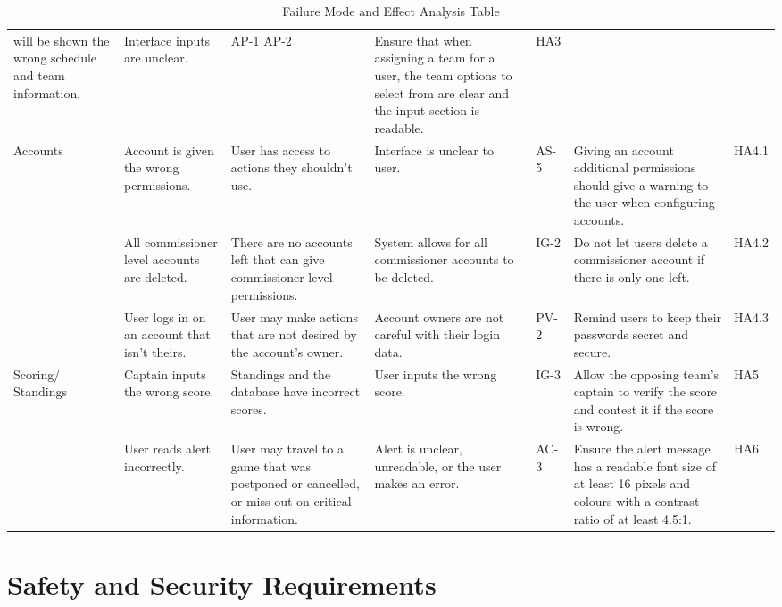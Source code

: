 \documentclass{article}
\begin{document}
\begin{landscape}
\begin{table}[ht]
\begin{tabularx}{504pt}{|p{3cm}||p{4cm}|p{4cm}|p{4cm}|p{1cm}|p{5.75cm}|p{1cm}|}
will be shown the wrong schedule and team information. & Interface inputs are
unclear. & AP-1 AP-2 & Ensure that when assigning a team for a
user, the team options to select from are clear and the input section is
readable. & HA3\\
\cline{1-7}
\multirow{2}{2cm}{Accounts} & Account is given the wrong permissions. & User 
has access to actions they shouldn't use. & Interface is unclear to user. & AS-5 & Giving an account additional permissions should give
a warning to the user when configuring accounts. & HA4.1\\
\cline{2-7}
& All commissioner level accounts are deleted. & There are no accounts left
that can give commissioner level permissions. & System allows for all
commissioner accounts to be deleted. & IG-2 & Do not let users delete a
commissioner account if there is only one left. & HA4.2\\
\cline{2-7}
& User logs in on an account that isn't theirs. & User may make actions that
are not desired by the account's owner. & Account owners are not careful with
their login data. & PV-2 & Remind users to keep their passwords secret and secure.
& HA4.3\\
\cline{1-7}
\multirow{3}{2cm}{Scoring/ Standings} & Captain inputs the wrong score. &
Standings and the database have incorrect scores. & User inputs the wrong score. &
IG-3 & Allow the opposing team's captain to verify the score and contest it if
the score is wrong. & HA5\\
\cline{2-7}
\cline{1-7}
\multirow{3}{2cm}{Alerts} & User reads alert incorrectly. &
User may travel to a game that was postponed or cancelled, or miss out on
critical information. & Alert is unclear, unreadable, or the user makes an error. &
AC-3 & Ensure the alert message has a readable font size of at least 16 pixels
and colours with a contrast ratio of at least 4.5:1. & HA6\\
\cline{2-7}
\hline
\end{tabularx}
\caption{Failure Mode and Effect Analysis Table} %
\label{tab:FMEA}
\end{table}
\end{landscape}
\restoregeometry{}

\setcounter{page}{4}

\section{Safety and Security Requirements}
\end{document}
